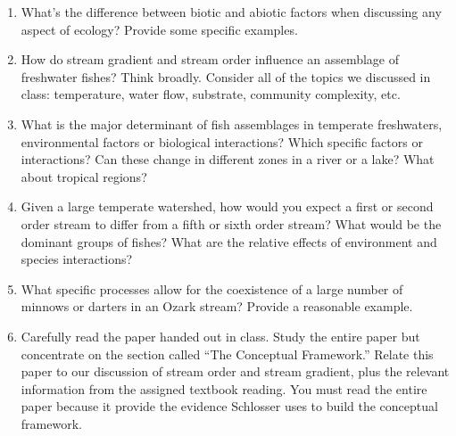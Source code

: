 \documentclass[letterpaper]{tufte-handout}
\begin{document}
\begin{enumerate}
	\item What’s the difference between biotic and abiotic factors when discussing any aspect of ecology?  Provide some specific examples.

	\item How do stream gradient and stream order influence an assemblage of freshwater fishes?  Think broadly.  Consider all of the topics we discussed in class: temperature, water flow, substrate, community complexity, etc.

	\item What is the major determinant of fish assemblages in temperate freshwaters, environmental factors or biological interactions?  Which specific factors or interactions?  Can these change in different zones in a river or a lake?  What about tropical regions?

	\item Given a large temperate watershed, how would you expect a first or second order stream to differ from a fifth or sixth order stream?  What would be the dominant groups of fishes?  What are the relative effects of environment and species interactions?

	\item What specific processes allow for the coexistence of a large number of minnows or darters in an Ozark stream? Provide a reasonable example.
	
	\item Carefully read the paper handed out in class. Study the entire paper but concentrate on the section called “The Conceptual Framework.” Relate this paper to our discussion of stream order and stream gradient, plus the relevant information from the assigned textbook reading. You must read the entire paper because it provide the evidence Schlosser uses to build the conceptual framework.

\end{enumerate}
\end{document}
